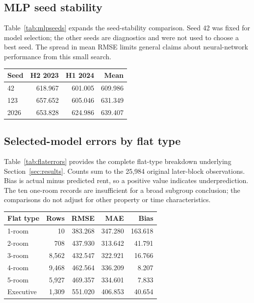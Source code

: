 \documentclass[conference]{IEEEtran}
\makeatletter
\newenvironment{localtable}{\par\addvspace{\medskipamount}\noindent
  \begin{minipage}{\columnwidth}\def\@captype{table}}{\end{minipage}\par
  \addvspace{\medskipamount}}
\makeatother
\begin{document}
\subsection{MLP seed stability}
Table~\ref{tab:mlpseeds} expands the seed-stability comparison. Seed 42 was
fixed for model selection; the other seeds are diagnostics and were not
used to choose a best seed. The spread in mean RMSE limits general claims
about neural-network performance from this small search.
\begin{localtable}
  \caption{MLP RMSE by seed with the same 35 base inputs and training protocol.}
  \label{tab:mlpseeds}
  \centering\small
  \setlength{\tabcolsep}{3pt}
  \begin{tabularx}{\columnwidth}{Xrrr}
    \toprule
Seed & H2 2023 & H1 2024 & Mean \\
    \midrule
42 & 618.967 & 601.005 & 609.986 \\
123 & 657.652 & 605.046 & 631.349 \\
2026 & 653.828 & 624.986 & 639.407 \\
    \bottomrule
  \end{tabularx}
\end{localtable}

\subsection{Selected-model errors by flat type}
Table~\ref{tab:flaterrors} provides the complete flat-type breakdown underlying
Section~\ref{sec:results}. Counts sum to the 25,984 original later-block
observations. Bias is actual minus predicted rent, so a positive value
indicates underprediction. The ten one-room records are insufficient for
a broad subgroup conclusion; the comparisons do not adjust for other
property or time characteristics.
\begin{localtable}
  \caption{CatBoost flat-type errors, July 2024--March 2025.}
  \label{tab:flaterrors}
  \centering\small
  \setlength{\tabcolsep}{3pt}
  \begin{tabularx}{\columnwidth}{Xrrrr}
    \toprule
Flat type & Rows & RMSE & MAE & Bias \\
    \midrule
1-room & 10 & 383.268 & 347.280 & 163.618 \\
2-room & 708 & 437.930 & 313.642 & 41.791 \\
3-room & 8,562 & 432.547 & 322.921 & 16.766 \\
4-room & 9,468 & 462.564 & 336.209 & 8.207 \\
5-room & 5,927 & 469.357 & 334.601 & 7.833 \\
Executive & 1,309 & 551.020 & 406.853 & 40.654 \\
    \bottomrule
  \end{tabularx}
\end{localtable}
\end{document}
